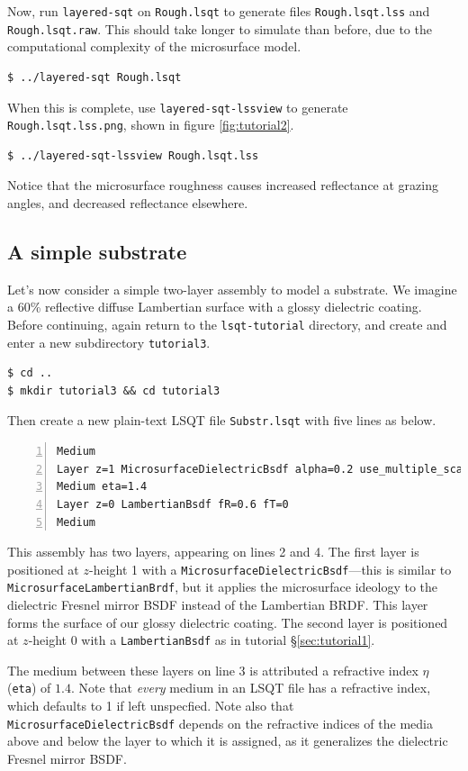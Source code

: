 \documentclass[
    twoside,
    twocolumn,
    letterpaper,
    10pt]{article}
\newcommand\namett[2]{{\color{code#1}\texttt{#2}}}
\begin{document}
Now, run \texttt{layered-sqt} on \texttt{Rough.lsqt} to generate
files \texttt{Rough.lsqt.lss} and \texttt{Rough.lsqt.raw}. This should take
longer to simulate than before, due to the computational complexity of the
microsurface model.
\begin{verbatim}
$ ../layered-sqt Rough.lsqt
\end{verbatim}
When this is complete, use \texttt{layered-sqt-lssview} to generate 
\texttt{Rough.lsqt.lss.png}, shown in figure \ref{fig:tutorial2}.
\begin{verbatim}
$ ../layered-sqt-lssview Rough.lsqt.lss
\end{verbatim}
Notice that the microsurface roughness causes increased reflectance at 
grazing angles, and decreased reflectance elsewhere.

\subsection{A simple substrate}
\label{sec:tutorial3}

Let's now consider a simple two-layer assembly to model a substrate. 
We imagine a 60\% reflective diffuse Lambertian surface with a glossy 
dielectric coating. Before continuing, again return to the 
\texttt{lsqt-tutorial} directory, and create and enter a new 
subdirectory \texttt{tutorial3}.
\begin{verbatim}
$ cd ..
$ mkdir tutorial3 && cd tutorial3
\end{verbatim}

Then create a new plain-text LSQT file \texttt{Substr.lsqt} with
five lines as below.
\begin{lstlisting}[numbers=left]
Medium
Layer z=1 MicrosurfaceDielectricBsdf alpha=0.2 use_multiple_scattering=false
Medium eta=1.4
Layer z=0 LambertianBsdf fR=0.6 fT=0
Medium
\end{lstlisting}
This assembly has two layers, appearing on lines 2 and 4. 
The first layer is positioned at $z$-height 1 with a 
\namett{purple}{MicrosurfaceDielectricBsdf}---this is similar to 
\namett{purple}{MicrosurfaceLambertianBrdf}, 
but it applies 
the microsurface ideology to the dielectric Fresnel mirror BSDF instead of 
the Lambertian BRDF. This layer forms the surface of our glossy dielectric 
coating.
The second layer is positioned at $z$-height 0 with a 
\namett{purple}{LambertianBsdf} as in tutorial \S\ref{sec:tutorial1}.

The medium between these layers on line 3 is attributed a
refractive index $\eta$ (\texttt{eta}) of $1.4$. Note that 
\emph{every} medium in an LSQT
file has a refractive index, which defaults to 1 if left unspecfied. 
Note also that \namett{purple}{MicrosurfaceDielectricBsdf} depends on the
refractive indices of the media above and below the layer to which it is
assigned, as it generalizes the dielectric Fresnel mirror BSDF.
\end{document}
